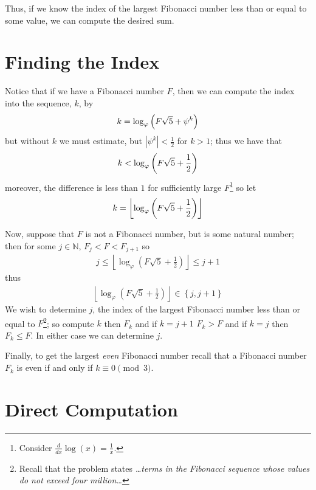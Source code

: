 \documentclass[oneside,12pt]{book}   	%
\newcounter{ex}
\newcounter{pr}
\theoremstyle{definition}
\newcommand{\set}[1]{\left\{#1\right\}}
\newcommand{\floor}[1]{\left\lfloor #1 \right\rfloor}
\newcommand{\order}[1]{\left| #1 \right|}
\begin{document}
\begin{spacing}{1.618}
		Thus, if we know the index of the largest Fibonacci number less than or equal to some value, we can compute the desired sum. 	
			
	\section{Finding the Index}
		
		Notice that if we have a Fibonacci number $F$, then we can compute the index into the sequence, $k$, by 
		\begin{alignat}{4}
			k=\log_\varphi{\left(F\sqrt{5}+\psi^k\right)} \notag
		\end{alignat}
		but without $k$ we must estimate, but $\order{\psi^k}<\frac{1}{2}$ for $k>1$; thus we have that 
		\begin{alignat}{4}
			k<\log_\varphi{\left(F\sqrt{5}+\frac{1}{2}\right)} \notag 
		\end{alignat}
		moreover, the difference is less than $1$ for sufficiently large $F$\footnote{Consider $\frac{d}{dx}\log{(x)}=\frac{1}{x}$.} so let 
		\begin{alignat}{4}
			k=\floor{\log_\varphi{\left(F\sqrt{5}+\frac{1}{2}\right)}} \notag
		\end{alignat}
		
		Now, suppose that $F$ is not a Fibonacci number, but is some natural number; then for some $j\in\mathbb{N}$, $F_j<F<F_{j+1}$ so 
		\begin{alignat}{4}
			j\leq\floor{\log_\varphi{\left(F\sqrt{5}+\frac{1}{2}\right)}}\leq j+1
		\end{alignat}
		thus
		\begin{alignat}{4}
			\floor{\log_\varphi{\left(F\sqrt{5}+\frac{1}{2}\right)}}\in \set{j, j+1}
		\end{alignat}
		We wish to determine $j$, the index of the largest Fibonacci number less than or equal to $F$\footnote{Recall that the problem states \emph{\dots terms in the Fibonacci sequence whose values do not exceed four million\dots}}; so compute $k$ then $F_k$ and if $k=j+1$ $F_k>F$ and if $k=j$ then $F_k\leq F$. In either case we can determine $j$. 
		
		Finally, to get the largest \emph{even} Fibonacci number recall that a Fibonacci number $F_k$ is even if and only if $k\equiv 0\pmod 3$. 

	\section{Direct Computation}


\end{spacing}
\end{document}
